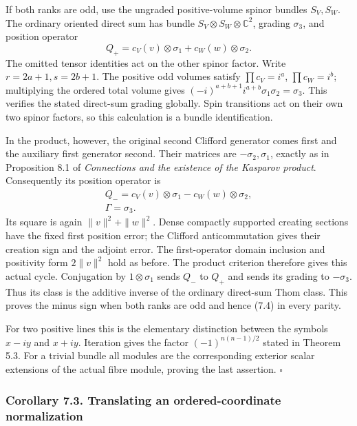 \documentclass[
  11pt,
]{article}
\begin{document}
If both ranks are odd, use the ungraded positive-volume spinor bundles
\(S_V,S_W\). The ordinary oriented direct sum has bundle
\(S_V\otimes S_W\otimes\mathbb C^2\), grading \(\sigma_3\), and position
operator \[
Q_+=c_V(v)\otimes\sigma_1+c_W(w)\otimes\sigma_2.
\tag{7.6}
\] The omitted tensor identities act on the other spinor factor. Write
\(r=2a+1,s=2b+1\). The positive odd volumes satisfy \(\prod c_V=i^a\),
\(\prod c_W=i^b\); multiplying the ordered total volume gives
\((-i)^{a+b+1}i^{a+b}\sigma_1\sigma_2=\sigma_3\). This verifies the
stated direct-sum grading globally. Spin transitions act on their own
two spinor factors, so this calculation is a bundle identification.

In the product, however, the original second Clifford generator comes
first and the auxiliary first generator second. Their matrices are
\(-\sigma_2,\sigma_1\), exactly as in Proposition 8.1 of
\emph{Connections and the existence of the Kasparov product}.
Consequently its position operator is \[
\begin{gathered}
Q_-=c_V(v)\otimes\sigma_1-c_W(w)\otimes\sigma_2,\\
\Gamma=\sigma_3.
\end{gathered}
\tag{7.7}
\] Its square is again \(\|v\|^2+\|w\|^2\). Dense compactly supported
creating sections have the fixed first position error; the Clifford
anticommutation gives their creation sign and the adjoint error. The
first-operator domain inclusion and positivity form \(2\|v\|^2\) hold as
before. The product criterion therefore gives this actual cycle.
Conjugation by \(1\otimes\sigma_1\) sends \(Q_-\) to \(Q_+\) and sends
its grading to \(-\sigma_3\). Thus its class is the additive inverse of
the ordinary direct-sum Thom class. This proves the minus sign when both
ranks are odd and hence (7.4) in every parity.

For two positive lines this is the elementary distinction between the
symbols \(x-iy\) and \(x+iy\). Iteration gives the factor
\((-1)^{n(n-1)/2}\) stated in Theorem 5.3. For a trivial bundle all
modules are the corresponding exterior scalar extensions of the actual
fibre module, proving the last assertion. \(\square\)

\subsubsection{Corollary 7.3. Translating an ordered-coordinate
normalization}\label{corollary-7.3.-translating-an-ordered-coordinate-normalization}
\end{document}
